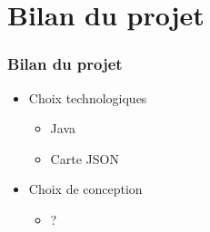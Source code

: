 \section{Bilan du projet}
\begin{frame}
\frametitle{Bilan du projet}
\begin{itemize}
	\item Choix technologiques
	\begin{itemize}
		\item Java
		\item Carte JSON
	\end{itemize}
	\item Choix de conception
	\begin{itemize}
		\item ?
	\end{itemize}
\end{itemize}
\end{frame}

